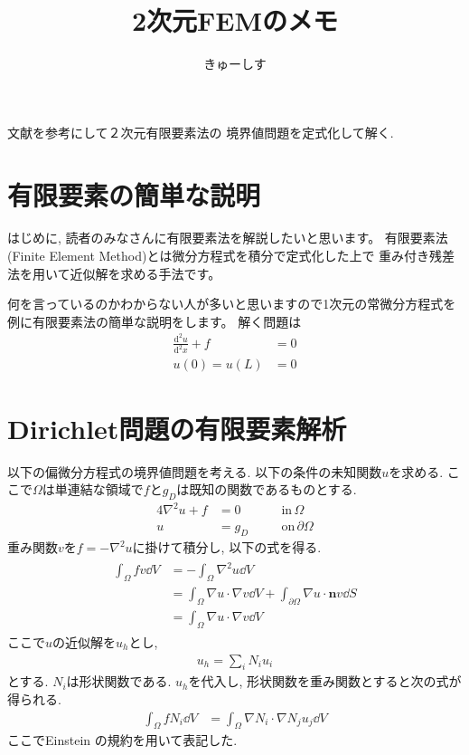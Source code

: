 \documentclass[paper=a4]{jlreq}
\begin{document}
\title{2次元FEMのメモ}
\author{きゅーしす}
\date{}
\maketitle

文献\cite{Larson2013}を参考にして２次元有限要素法の
境界値問題を定式化して解く.

\section{有限要素の簡単な説明}
はじめに, 読者のみなさんに有限要素法を解説したいと思います。
有限要素法 (Finite Element Method)とは微分方程式を積分で定式化した上で
重み付き残差法を用いて近似解を求める手法です。

何を言っているのかわからない人が多いと思いますので1次元の常微分方程式を
例に有限要素法の簡単な説明をします。
解く問題は
\begin{align}
    \frac{\mathrm{d}^2u}{\mathrm{d}^2x} +f &=0 \label{eq:ode} \\
    u(0) = u(L) &= 0 \label{eq:ode:bc}
\end{align}

\section{Dirichlet問題の有限要素解析}
以下の偏微分方程式の境界値問題を考える.
以下の条件の未知関数$u$を求める. 
ここで$\Omega$は単連結な領域で$f$と$g_D$は既知の関数であるものとする.
\begin{alignat}{4}
    \nabla^2 u + f &= 0 &\quad& \mathrm{in}\, \Omega \label{eq:poisson}\\
    u &= g_D &\quad& \mathrm{on}\, \partial\Omega \label{eq:dirichlet_bc}
\end{alignat}
重み関数$v$を$f = -\nabla^2 u$に掛けて積分し, 以下の式を得る.
\begin{align}
    \begin{split}
        \int_\Omega fv\dd{V} &= -\int_\Omega \nabla^2 u \dd{V} \\
        &= \int_\Omega \nabla u\cdot \nabla v \dd{V} 
        + \int_{\partial\Omega} \nabla u \cdot \bm{n} v \dd{S} \\
        &=  \int_\Omega \nabla u\cdot \nabla v \dd{V}
    \end{split}
\end{align}
ここで$u$の近似解を$u_h$とし, 
\begin{align}
    u_h = \sum_iN_iu_i
\end{align}
とする. $N_i$は形状関数である.
$u_h$を代入し, 形状関数を重み関数とすると次の式が得られる.
\begin{align}
    \int_\Omega fN_i\dd{V} &=  \int_\Omega \nabla N_i \cdot \nabla N_j u_j \dd{V} \label{eq:weak_form}
\end{align}
ここでEinstein の規約を用いて表記した.
\end{document}
